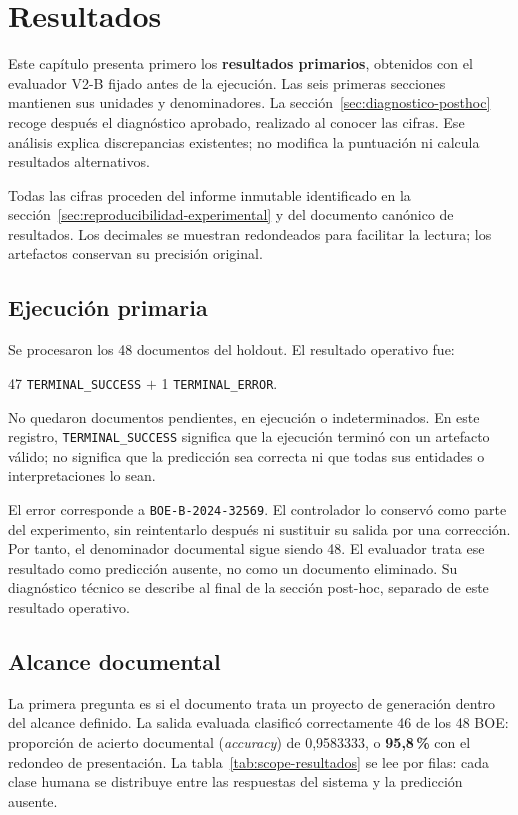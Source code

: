 \chapter{Resultados}
\label{ch:resultados}
Este capítulo presenta primero los \textbf{resultados primarios}, obtenidos
con el evaluador V2-B fijado antes de la ejecución. Las seis primeras secciones
mantienen sus unidades y denominadores. La
sección~\ref{sec:diagnostico-posthoc} recoge después el diagnóstico aprobado,
realizado al conocer las cifras. Ese análisis explica discrepancias existentes;
no modifica la puntuación ni calcula resultados alternativos.

Todas las cifras proceden del informe inmutable identificado en la
sección~\ref{sec:reproducibilidad-experimental} y del documento canónico de
resultados. Los decimales se muestran redondeados para facilitar la lectura;
los artefactos conservan su precisión original.

\section{Ejecución primaria}
\label{sec:resultado-ejecucion}
Se procesaron los 48 documentos del holdout. El resultado operativo fue:
\begin{center}
47 \texttt{TERMINAL\_SUCCESS} $+$ 1 \texttt{TERMINAL\_ERROR}.
\end{center}
No quedaron documentos pendientes, en ejecución o indeterminados. En este registro,
\texttt{TERMINAL\_SUCCESS} significa que la ejecución terminó con un artefacto
válido; no significa que la predicción sea correcta ni que todas sus entidades
o interpretaciones lo sean.

El error corresponde a \texttt{BOE-B-2024-32569}. El controlador lo conservó como parte del
experimento, sin reintentarlo después ni sustituir su salida por una
corrección. Por tanto, el denominador documental sigue siendo 48. El
evaluador trata ese resultado como predicción ausente, no como un documento
eliminado. Su diagnóstico técnico se describe al final de la sección
post-hoc, separado de este resultado operativo.

\section{Alcance documental}
La primera pregunta es si el documento trata un proyecto de generación
dentro del alcance definido. La salida evaluada clasificó correctamente 46 de los
48 BOE: proporción de acierto documental (\emph{accuracy}) de 0,9583333,
o \textbf{95,8\,\%} con el redondeo de presentación. La
tabla~\ref{tab:scope-resultados} se lee por filas: cada clase humana se
distribuye entre las respuestas del sistema y la predicción ausente.

